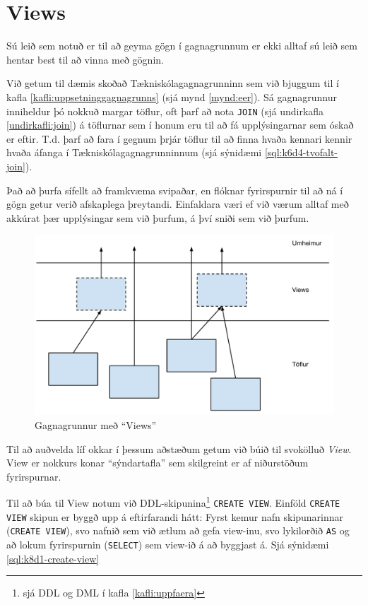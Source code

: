 \section{Views}
\label{undirkafli:views}
Sú leið sem notuð er til að geyma gögn í gagnagrunnum er ekki alltaf sú leið sem hentar best til að vinna með gögnin.

Við getum til dæmis skoðað Tækniskólagagnagrunninn sem við bjuggum til í kafla \ref{kafli:uppsetninggagnagrunns} (sjá mynd \ref{mynd:eer}). Sá gagnagrunnur inniheldur þó nokkuð margar töflur, oft þarf að nota \verb|JOIN| (sjá undirkafla \ref{undirkafli:join}) á töflurnar sem í honum eru til að fá upplýsingarnar sem óskað er eftir. T.d. þarf að fara í gegnum þrjár töflur til að finna hvaða kennari kennir hvaða áfanga í Tækniskólagagnagrunninnum (sjá sýnidæmi \ref{sql:k6d4-tvofalt-join}).

Það að þurfa sífellt að framkvæma svipaðar, en flóknar fyrirspurnir til að ná í gögn getur verið afskaplega þreytandi. Einfaldara væri ef við værum alltaf með akkúrat þær upplýsingar sem við þurfum, á því sniði sem við þurfum.

\begin{figure}
\caption[View]{Gagnagrunnur með ``Views''}
\label{mynd:view}
\centering
\includegraphics[width=\linewidth]{myndir/views}
\end{figure}

Til að auðvelda líf okkar í þessum aðstæðum getum við búið til svokölluð \emph{View}. View er nokkurs konar ``sýndartafla'' sem skilgreint er af niðurstöðum fyrirspurnar.

Til að búa til View notum við DDL-skipunina\footnote{sjá DDL og DML í kafla \ref{kafli:uppfaera}} \verb|CREATE VIEW|. Einföld \verb|CREATE VIEW| skipun er byggð upp á eftirfarandi hátt: Fyrst kemur nafn skipunarinnar (\verb|CREATE VIEW|), svo nafnið sem við ætlum að gefa view-inu, svo lykilorðið \verb|AS| og að lokum fyrirspurnin (\verb|SELECT|) sem view-ið á að byggjast á. Sjá sýnidæmi \ref{sql:k8d1-create-view}

